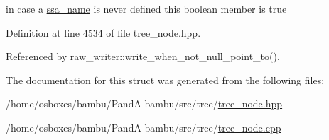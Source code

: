 in case a \hyperlink{structssa__name}{ssa\+\_\+name} is never defined this boolean member is true 



Definition at line 4534 of file tree\+\_\+node.\+hpp.



Referenced by raw\+\_\+writer\+::write\+\_\+when\+\_\+not\+\_\+null\+\_\+point\+\_\+to().



The documentation for this struct was generated from the following files\+:\begin{DoxyCompactItemize}
\item 
/home/osboxes/bambu/\+Pand\+A-\/bambu/src/tree/\hyperlink{tree__node_8hpp}{tree\+\_\+node.\+hpp}\item 
/home/osboxes/bambu/\+Pand\+A-\/bambu/src/tree/\hyperlink{tree__node_8cpp}{tree\+\_\+node.\+cpp}\end{DoxyCompactItemize}
